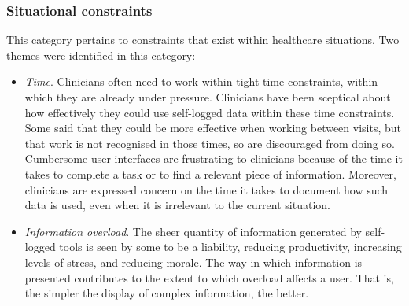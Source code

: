 \documentclass{sigchi}
\begin{document}
\subsubsection{Situational constraints}

This category pertains to constraints that exist within healthcare situations. Two themes were identified in this category:

\begin{itemize}
    \item \textit{Time}. Clinicians often need to work within tight time constraints, within which they are already under pressure. Clinicians have been sceptical about how effectively they could use self-logged data within these time constraints. Some said that they could be more effective when working between visits, but that work is not recognised in those times, so are discouraged from doing so. Cumbersome user interfaces are frustrating to clinicians because of the time it takes to complete a task or to find a relevant piece of information. Moreover, clinicians are expressed concern on the time it takes to document how such data is used, even when it is irrelevant to the current situation.
    
    \item \textit{Information overload}. The sheer quantity of information generated by self-logged tools is seen by some to be a liability, reducing  productivity, increasing levels of stress, and reducing morale. The way in which information is presented contributes to the extent to which overload affects a user.  That is, the simpler the display of complex information, the better.
    
\end{itemize}


\end{document}
